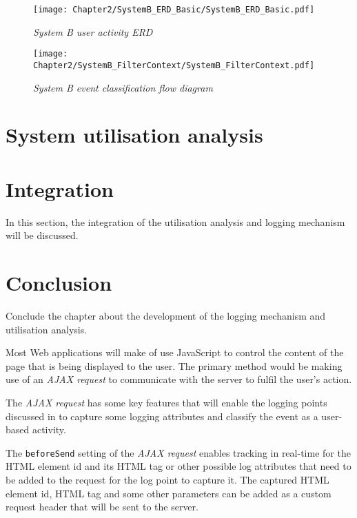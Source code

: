 \begin{figure}[!htb] %
	\centering %
	\texttt{[image: Chapter2/SystemB\_ERD\_Basic/SystemB\_ERD\_Basic.pdf]}
	\caption[System B user activity ERD]
	{\textit{System B user activity ERD}}\label{fig:ch2_SystemB_Basic_ERD}
\end{figure}

\clearpage

\begin{figure}[!htb]
	\centering
	\texttt{[image: Chapter2/SystemB\_FilterContext/SystemB\_FilterContext.pdf]}
	\caption[System B event classification]
	{\textit{System B event classification flow diagram}}\label{fig:CH2_SystemB_FilterContext}
\end{figure}

\clearpage

\section{System utilisation analysis}

\section{Integration}
In this section, the integration of the utilisation analysis and logging mechanism will be discussed.

\section{Conclusion}
Conclude the chapter about the development of the logging mechanism and utilisation analysis.

Most Web applications will make of use JavaScript to control the content of the page that is being displayed to the user. The primary method would be making use of an \textit{AJAX request} to communicate with the server to fulfil the user's action.\par The \textit{AJAX request} has some key features that will enable the logging points discussed in  to capture some logging attributes and classify the event as a user-based activity. \par The \texttt{beforeSend} setting of the \textit{AJAX request} enables tracking in real-time for the HTML element id and its HTML tag or other possible log attributes that need to be added to the request for the log point to capture it. The captured HTML element id, HTML tag and some other parameters can be added as a custom request header that will be sent to the server.

